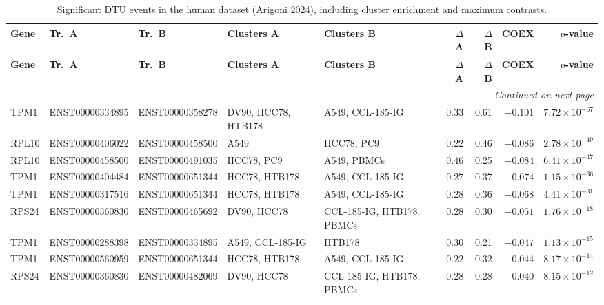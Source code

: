 \begin{landscape}
\begingroup
\small
\setlength{\tabcolsep}{4pt}
\begin{longtable}{@{} l l l >{\raggedright\arraybackslash}p{4.6cm} >{\raggedright\arraybackslash}p{4.6cm} r r r r @{}}
\caption{Significant DTU events in the human dataset (Arigoni 2024), including cluster enrichment and maximum contrasts.\label{tab:arrigoni_landscape}}\\
\toprule
\textbf{Gene} & \textbf{Tr.~A} & \textbf{Tr.~B} & \textbf{Clusters A} & \textbf{Clusters B} & \textbf{$\Delta$ A} & \textbf{$\Delta$ B} & \textbf{COEX} & \textbf{$p$-value} \\
\midrule
\endfirsthead
\toprule
\textbf{Gene} & \textbf{Tr.~A} & \textbf{Tr.~B} & \textbf{Clusters A} & \textbf{Clusters B} & \textbf{$\Delta$ A} & \textbf{$\Delta$ B} & \textbf{COEX} & \textbf{$p$-value} \\
\midrule
\endhead
\midrule
\multicolumn{9}{r}{\textit{Continued on next page}} \\
\endfoot
\bottomrule
\endlastfoot
TPM1   & ENST00000334895 & ENST00000358278 & DV90, HCC78, HTB178 & A549, CCL-185-IG & 0.33 & 0.61 & $-0.101$ & $7.72 \times 10^{-67}$ \\
RPL10  & ENST00000406022 & ENST00000458500 & A549 & HCC78, PC9 & 0.22 & 0.46 & $-0.086$ & $2.78 \times 10^{-49}$ \\
RPL10  & ENST00000458500 & ENST00000491035 & HCC78, PC9 & A549, PBMCs & 0.46 & 0.25 & $-0.084$ & $6.41 \times 10^{-47}$ \\
TPM1   & ENST00000404484 & ENST00000651344 & HCC78, HTB178 & A549, CCL-185-IG & 0.27 & 0.37 & $-0.074$ & $1.15 \times 10^{-36}$ \\
TPM1   & ENST00000317516 & ENST00000651344 & HCC78, HTB178 & A549, CCL-185-IG & 0.28 & 0.36 & $-0.068$ & $4.41 \times 10^{-31}$ \\
RPS24  & ENST00000360830 & ENST00000465692 & DV90, HCC78 & CCL-185-IG, HTB178, PBMCs & 0.28 & 0.30 & $-0.051$ & $1.76 \times 10^{-18}$ \\
TPM1   & ENST00000288398 & ENST00000334895 & A549, CCL-185-IG & HTB178 & 0.30 & 0.21 & $-0.047$ & $1.13 \times 10^{-15}$ \\
TPM1   & ENST00000560959 & ENST00000651344 & HCC78, HTB178 & A549, CCL-185-IG & 0.22 & 0.32 & $-0.044$ & $8.17 \times 10^{-14}$ \\
RPS24  & ENST00000360830 & ENST00000482069 & DV90, HCC78 & CCL-185-IG, HTB178, PBMCs & 0.28 & 0.28 & $-0.040$ & $8.15 \times 10^{-12}$ \\

\end{longtable}
\end{landscape}
